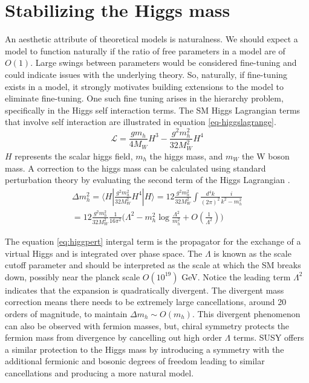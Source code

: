 \section{Stabilizing the Higgs mass}

An aesthetic attribute of theoretical models is naturalness. We should expect a model to function naturally if the ratio of free parameters in a model are of $O(1)$. Large swings between parameters would be considered fine-tuning and could indicate issues with the underlying theory. So, naturally, if fine-tuning exists in a model, it strongly motivates building extensions to the model to eliminate fine-tuning. %
One such fine tuning arises in the hierarchy problem, specifically in the Higgs self interaction terms. The SM Higgs Lagrangian terms that involve self interaction are illustrated in equation \ref{eq-higgslagrange}.
\begin{equation}
\label{eq-higgslagrange}
\mathcal{L}=\frac{gm_h}{4M_W}H^3 - \frac{g^2m_h^2}{32M_W^2}H^4
\end{equation}
$H$ represents the scalar higgs field, $m_h$ the higgs mass, and $m_W$ the W boson  mass. A correction to the higgs mass can be calculated using standard perturbation theory by evaluating the second term of the Higgs Lagrangian \cite{Baer:2007izw}. 
\begin{equation}
\label{eq:higgpert}
\begin{split}
\Delta m_h^2 = \langle H | \frac{g^2m_h^2}{32M_W^2} H^4 | H  \rangle = 12\frac{g^2m_h^2}{32M_W^2}\int \frac{d^4 k}{(2\pi)^2} \frac{i}{k^2 - m_h^2}\\
= 12\frac{g^2m_h^2}{32M_W^2} \frac{1}{16\pi^2}\big( \Lambda^2 - m_h^2\log\frac{\Lambda^2}{m_h^2} + O(\frac{1}{\Lambda^2})\big)
\end{split} 
\end{equation}
 
The equation \ref{eq:higgpert} intergal term is the propagator for the exchange of a virtual Higgs and is integrated over phase space. The $\Lambda$ is known as the scale cutoff parameter and should be interpreted as the scale at which the SM breaks down, possibly near the planck scale $O(10^{19})$ GeV. Notice the leading term $\Lambda^2$ indicates that the expansion is quadratically divergent. The divergent mass correction means there needs to be extremely large cancellations, around 20 orders of magnitude, to maintain $\Delta m_h \sim O(m_h)$. This divergent phenomenon can also be observed with fermion masses, but, chiral symmetry protects the fermion mass from divergence by cancelling out high order $\Lambda$ terms. SUSY offers a similar protection to the Higgs mass by introducing a symmetry with the additional fermionic and bosonic degrees of freedom leading to similar cancellations and producing a more natural model. 


